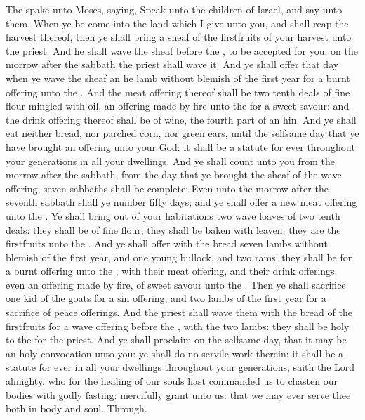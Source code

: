  The  spake unto Moses, saying, Speak unto the children of Israel, and say unto them, When ye be come into the land which I give unto you, and shall reap the harvest thereof, then ye shall bring a sheaf of the firstfruits of your harvest unto the priest: And he shall wave the sheaf before the , to be accepted for you: on the morrow after the sabbath the priest shall wave it. And ye shall offer that day when ye wave the sheaf an he lamb without blemish of the first year for a burnt offering unto the . And the meat offering thereof shall be two tenth deals of fine flour mingled with oil, an offering made by fire unto the  for a sweet savour: and the drink offering thereof shall be of wine, the fourth part of an hin. And ye shall eat neither bread, nor parched corn, nor green ears, until the selfsame day that ye have brought an offering unto your God: it shall be a statute for ever throughout your generations in all your dwellings. And ye shall count unto you from the morrow after the sabbath, from the day that ye brought the sheaf of the wave offering; seven sabbaths shall be complete: Even unto the morrow after the seventh sabbath shall ye number fifty days; and ye shall offer a new meat offering unto the . Ye shall bring out of your habitations two wave loaves of two tenth deals: they shall be of fine flour; they shall be baken with leaven; they are the firstfruits unto the . And ye shall offer with the bread seven lambs without blemish of the first year, and one young bullock, and two rams: they shall be for a burnt offering unto the , with their meat offering, and their drink offerings, even an offering made by fire, of sweet savour unto the . Then ye shall sacrifice one kid of the goats for a sin offering, and two lambs of the first year for a sacrifice of peace offerings. And the priest shall wave them with the bread of the firstfruits for a wave offering before the , with the two lambs: they shall be holy to the  for the priest. And ye shall proclaim on the selfsame day, that it may be an holy convocation unto you: ye shall do no servile work therein: it shall be a statute for ever in all your dwellings throughout your generations, saith the Lord almighty.
\collect
{} who for the healing of our souls hast commanded us to chasten our bodies with godly fasting: mercifully grant unto us: that we may ever serve thee both in body and soul. Through.
